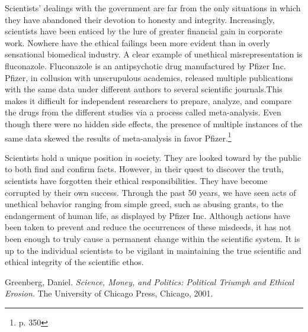 \documentclass{article}[12pt]
\begin{document}
Scientists' dealings with the government are far from the only situations in
which they have abandoned their devotion to honesty and integrity.
Increasingly, scientists have been enticed by the lure of greater financial
gain in corporate work. Nowhere have the ethical failings been more evident
than in overly sensational biomedical industry. A clear example of unethical
misrepresentation is fluconazole.  Fluconazole is an antipsychotic drug
manufactured by Pfizer Inc.  Pfizer, in collusion with unscrupulous academics,
released multiple publications with the same data under different authors to
several scientific journals.This makes it difficult for independent researchers
to prepare, analyze, and compare the drugs from  the different studies via a
process called meta-analysis. Even though there were no hidden side effects, 
the presence of multiple instances of the same
data skewed the results of meta-analysis in favor Pfizer.\footnote{p. 350}

Scientists hold a unique position in society. They are looked toward by the
public to both find and confirm facts. However, in their quest to discover the
truth, scientists have forgotten their ethical responsibilities.  They have
become corrupted by their own success.  Through the past 50 years, we have seen
acts of unethical behavior ranging from simple greed, such as abusing grants,
to the endangerment of human life, as displayed by Pfizer Inc.  Although
actions have been taken to prevent and reduce the occurrences of these
misdeeds, it has not been enough to truly cause a permanent change within the
scientific system. It is up to the individual scientists to be vigilant in
maintaining the true scientific and ethical integrity of the scientific ethos.

\newpage
\begin{thebibliography}{9}

  Greenberg, Daniel.
  \emph{Science, Money, and Politics: Political Triumph and Ethical Erosion}.
  The University of Chicago Press, Chicago,
  2001.

\end{thebibliography}
\end{document}
